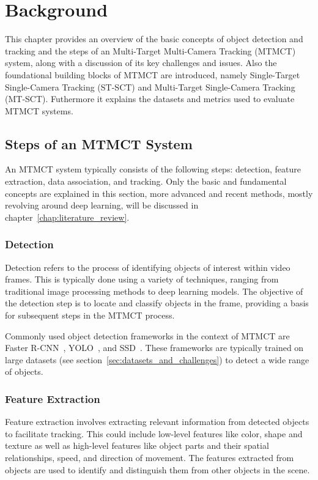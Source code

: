 \chapter{Background}\label{chap:background}
This chapter provides an overview of the basic concepts of object detection and tracking and the steps of an Multi-Target Multi-Camera Tracking (MTMCT) system, along with a discussion of its key challenges and issues. Also the foundational building blocks of MTMCT are introduced, namely Single-Target Single-Camera Tracking (ST-SCT) and Multi-Target Single-Camera Tracking (MT-SCT). Futhermore it explains the datasets and metrics used to evaluate MTMCT systems.

\section{Steps of an MTMCT System}\label{sec:steps_of_an_mtmct_system}
An MTMCT system typically consists of the following steps: detection, feature extraction, data association, and tracking. Only the basic and fundamental concepts are explained in this section, more advanced and recent methods, mostly revolving around deep learning, will be discussed in chapter~\ref{chap:literature_review}.

\subsection{Detection}\label{subsec:detection}
Detection refers to the process of identifying objects of interest within video frames. This is typically done using a variety of techniques, ranging from traditional image processing methods to deep learning models. The objective of the detection step is to locate and classify objects in the frame, providing a basis for subsequent steps in the MTMCT process.

Commonly used object detection frameworks in the context of MTMCT are Faster R-CNN~\cite{Ren17}, YOLO~\cite{Redmon15}, and SSD~\cite{Liu15}. These frameworks are typically trained on large datasets (see section~\ref{sec:datasets_and_challenges}) to detect a wide range of objects.

\subsection{Feature Extraction}\label{subsec:feature_extraction}
Feature extraction involves extracting relevant information from detected objects to facilitate tracking. This could include low-level features like color, shape and texture as well as high-level features like object parts and their spatial relationships, speed, and direction of movement. The features extracted from objects are used to identify and distinguish them from other objects in the scene.


